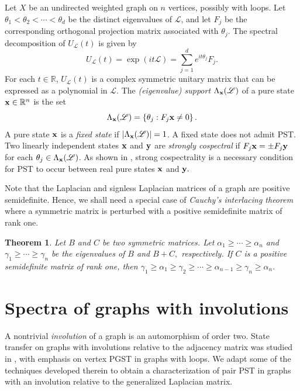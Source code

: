 \documentclass[12pt,a4paper]{article}
\newtheorem{thm}{Theorem}
\def \x {{\bf x}}
\def \y {{\bf y}}
\begin{document}
Let $X$ be an undirected weighted graph on $n$ vertices, possibly with loops. Let $\theta_1 < \theta_2 < \cdots < \theta_d$ be the distinct eigenvalues of $\mathscr{L}$, and let $F_j$ be the corresponding orthogonal projection matrix associated with $\theta_j$. The spectral decomposition of  $U_\mathscr{L}(t)$ is given by
\[U_\mathscr{L}(t) = \exp{\left( i t \mathscr{L} \right)} = \sum_{j=1}^d e^{i t \theta_j} F_j.\]
For each $t\in\mathbb{R}$, $U_\mathscr{L}(t)$ is a complex symmetric unitary matrix that can be expressed as a polynomial in $\mathscr{L}$. The \emph{(eigenvalue) support} $\Lambda_\x(\mathscr{L})$ of a pure state $\x\in\mathbb{R}^n$ is the set
\begin{equation*}
\Lambda_\x(\mathscr{L}) = \left\{ \theta_j : F_j \x \neq 0 \right\}.
\end{equation*}
A pure state $\x$ is a \emph{fixed state}  if $|\Lambda_\x(\mathscr{L})| = 1$. A fixed state does not admit PST. Two linearly independent states $\x$ and $\y$ are \emph{strongly cospectral} if $F_j \x = \pm F_j \y$
for each $\theta_j \in \Lambda_\x(\mathscr{L})$. As shown in \cite[Lemma 5.1(1)]{god25}, strong cospectrality is a necessary condition for PST to occur between real pure states $\x$ and $\y.$

Note that the Laplacian and signless Laplacian matrices of a graph are positive semidefinite. Hence, we shall need a special case of \emph{Cauchy's interlacing theorem} where a symmetric matrix is perturbed with a positive semidefinite matrix of rank one.

\begin{thm}\cite{so}\label{T1}
Let $B$ and $C$ be two symmetric matrices. Let $\alpha_1 \geq \cdots \geq \alpha_n$ and $\gamma_1  \geq \cdots \geq \gamma_n $ be the eigenvalues of $B$ and $B+C,$ respectively. If $C$ is a positive semidefinite matrix of rank one, then
$\gamma_1 \geq \alpha_1 \geq \gamma_2 \geq \cdots\geq \alpha_{n-1} \geq \gamma_n \geq \alpha_n.$
\end{thm} 

\section{Spectra of graphs with involutions}\label{sec2}

A nontrivial \textit{involution} of a graph is an automorphism of order two.
State transfer on graphs with involutions relative to the adjacency matrix was studied in \cite{kempton}, with emphasis on vertex PGST in graphs with loops. We adapt some of the techniques developed therein to obtain a characterization of pair PST in graphs with an involution relative to the generalized Laplacian matrix. 
\end{document}
